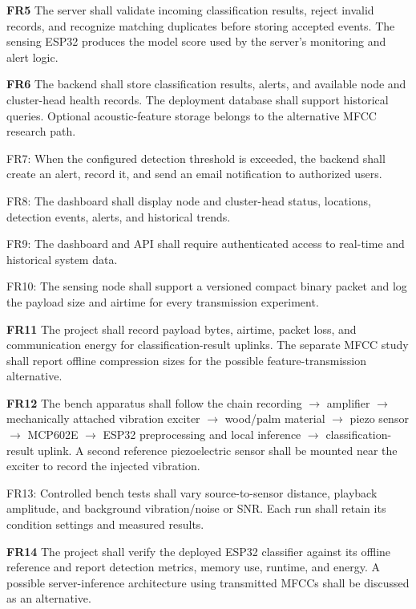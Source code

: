 \documentclass[12pt,a4paper,oneside]{memoir}
\newcommand{\earlierrevision}[1]{#1}
\newcommand{\newrevision}[1]{#1}
\begin{document}
\newrevision{\textbf{FR5} The server shall validate incoming classification results, reject invalid records, and recognize matching duplicates before storing accepted events. The sensing ESP32 produces the model score used by the server's monitoring and alert logic.}

\newrevision{\textbf{FR6} The backend shall store classification results, alerts, and available node and cluster-head health records. The deployment database shall support historical queries. Optional acoustic-feature storage belongs to the alternative MFCC research path.}

\earlierrevision{FR7: When the configured detection threshold is exceeded, the backend shall create an alert, record it, and send an email notification to authorized users.}

\earlierrevision{FR8: The dashboard shall display node and cluster-head status, locations, detection events, alerts, and historical trends.}

\earlierrevision{FR9: The dashboard and API shall require authenticated access to real-time and historical system data.}

\newrevision{FR10: The sensing node shall support a versioned compact binary packet and log the payload size and airtime for every transmission experiment.}

\newrevision{\textbf{FR11} The project shall record payload bytes, airtime, packet loss, and communication energy for classification-result uplinks. The separate MFCC study shall report offline compression sizes for the possible feature-transmission alternative.}

\newrevision{\textbf{FR12} The bench apparatus shall follow the chain recording $\rightarrow$ amplifier $\rightarrow$ mechanically attached vibration exciter $\rightarrow$ wood/palm material $\rightarrow$ piezo sensor $\rightarrow$ MCP602E $\rightarrow$ ESP32 preprocessing and local inference $\rightarrow$ classification-result uplink. A second reference piezoelectric sensor shall be mounted near the exciter to record the injected vibration.}

\newrevision{FR13: Controlled bench tests shall vary source-to-sensor distance, playback amplitude, and background vibration/noise or SNR. Each run shall retain its condition settings and measured results.}

\newrevision{\textbf{FR14} The project shall verify the deployed ESP32 classifier against its offline reference and report detection metrics, memory use, runtime, and energy. A possible server-inference architecture using transmitted MFCCs shall be discussed as an alternative.}
\end{document}
